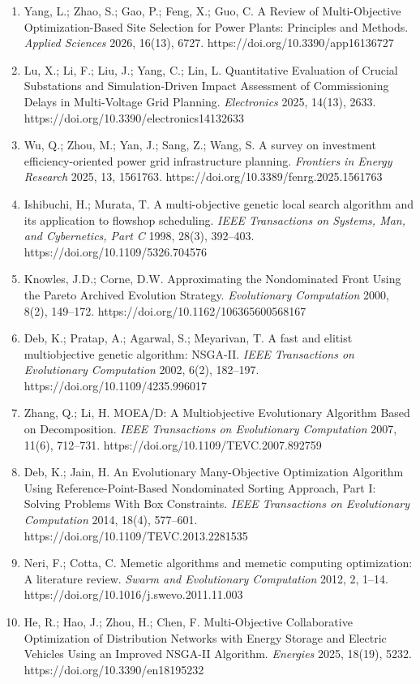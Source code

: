 \documentclass[
]{article}
\begin{document}
\begin{enumerate}
\item
  Yang, L.; Zhao, S.; Gao, P.; Feng, X.; Guo, C. A Review of Multi-Objective Optimization-Based Site Selection for Power Plants: Principles and Methods. \emph{Applied Sciences} 2026, 16(13), 6727. https://doi.org/10.3390/app16136727
\item
  Lu, X.; Li, F.; Liu, J.; Yang, C.; Lin, L. Quantitative Evaluation of Crucial Substations and Simulation-Driven Impact Assessment of Commissioning Delays in Multi-Voltage Grid Planning. \emph{Electronics} 2025, 14(13), 2633. https://doi.org/10.3390/electronics14132633
\item
  Wu, Q.; Zhou, M.; Yan, J.; Sang, Z.; Wang, S. A survey on investment efficiency-oriented power grid infrastructure planning. \emph{Frontiers in Energy Research} 2025, 13, 1561763. https://doi.org/10.3389/fenrg.2025.1561763
\item
  Ishibuchi, H.; Murata, T. A multi-objective genetic local search algorithm and its application to flowshop scheduling. \emph{IEEE Transactions on Systems, Man, and Cybernetics, Part C} 1998, 28(3), 392--403. https://doi.org/10.1109/5326.704576
\item
  Knowles, J.D.; Corne, D.W. Approximating the Nondominated Front Using the Pareto Archived Evolution Strategy. \emph{Evolutionary Computation} 2000, 8(2), 149--172. https://doi.org/10.1162/106365600568167
\item
  Deb, K.; Pratap, A.; Agarwal, S.; Meyarivan, T. A fast and elitist multiobjective genetic algorithm: NSGA-II. \emph{IEEE Transactions on Evolutionary Computation} 2002, 6(2), 182--197. https://doi.org/10.1109/4235.996017
\item
  Zhang, Q.; Li, H. MOEA/D: A Multiobjective Evolutionary Algorithm Based on Decomposition. \emph{IEEE Transactions on Evolutionary Computation} 2007, 11(6), 712--731. https://doi.org/10.1109/TEVC.2007.892759
\item
  Deb, K.; Jain, H. An Evolutionary Many-Objective Optimization Algorithm Using Reference-Point-Based Nondominated Sorting Approach, Part I: Solving Problems With Box Constraints. \emph{IEEE Transactions on Evolutionary Computation} 2014, 18(4), 577--601. https://doi.org/10.1109/TEVC.2013.2281535
\item
  Neri, F.; Cotta, C. Memetic algorithms and memetic computing optimization: A literature review. \emph{Swarm and Evolutionary Computation} 2012, 2, 1--14. https://doi.org/10.1016/j.swevo.2011.11.003
\item
  He, R.; Hao, J.; Zhou, H.; Chen, F. Multi-Objective Collaborative Optimization of Distribution Networks with Energy Storage and Electric Vehicles Using an Improved NSGA-II Algorithm. \emph{Energies} 2025, 18(19), 5232. https://doi.org/10.3390/en18195232

\end{enumerate}
\end{document}
